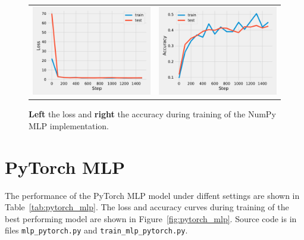 \documentclass{article}
\newcommand\·{\ensuremath{\cdot}}
\newcommand\…{\ensuremath{\ldots}}
\newcommand\1{\ensuremath{\mathds{1}}}
\begin{document}
\begin{figure}
  \begin{tabularx}{\linewidth}{XX}
    \includegraphics[width=\linewidth]{assignment_1/code/np_loss.pdf} &
    \includegraphics[width=\linewidth]{assignment_1/code/np_accuracy.pdf}
  \end{tabularx}
  \caption{\textbf{Left} the loss and \textbf{right} the accuracy during training of the NumPy MLP implementation.}
  \label{fig:numpy}
\end{figure}

\section{PyTorch MLP}
The performance of the PyTorch MLP model under diffent settings are shown in Table~\ref{tab:pytorch_mlp}.
The loss and accuracy curves during training of the best performing model are shown in Figure~\ref{fig:pytorch_mlp}.
Source code is in files \texttt{mlp\_pytorch.py} and \texttt{train\_mlp\_pytorch.py}.
\end{document}
